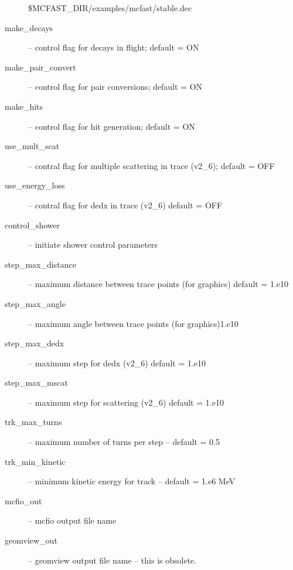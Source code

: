 \begin{description}
\$MCFAST\_DIR/examples/mcfast/stable.dec   
\item[make\_decays]  -- control flag for decays in flight;  default = ON
\item[make\_pair\_convert] -- control flag for pair conversions;  default = ON
\item[make\_hits]       -- control flag for hit generation; default = ON
\item[use\_mult\_scat]   -- contral flag for multiple scattering in trace
(v2\_6); default = OFF
\item[use\_energy\_loss] -- contral flag for  dedx in trace (v2\_6) default = OFF
\item[control\_shower] -- initiate shower control parameters
\item[step\_max\_distance]  -- maximum distance between trace points (for
graphics) default = 1.e10
\item[step\_max\_angle] --  maximum angle between trace points (for graphics)1.e10
\item[step\_max\_dedx]  -- maximum step for dedx (v2\_6) default = 1.e10
\item[step\_max\_mscat] -- maximum step for scattering (v2\_6) default = 1.e10
\item[trk\_max\_turns] -- maximum number of turns per step -- default = 0.5
\item[trk\_min\_kinetic] -- minimum kinetic energy for track -- default = 1.e6 MeV
\item[mcfio\_out]  -- mcfio output file name
\item[geomview\_out] -- geomview output file name -- this is obsolete.
\end{description}


\filbreak

